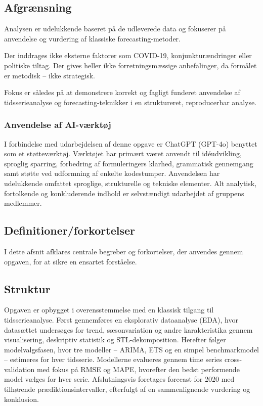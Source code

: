 \documentclass[
]{article}
\begin{document}
\subsection{Afgrænsning}\label{afgruxe6nsning}

Analysen er udelukkende baseret på de udleverede data og fokuserer på
anvendelse og vurdering af klassiske forecasting-metoder.

Der inddrages ikke eksterne faktorer som COVID-19, konjunkturændringer
eller politiske tiltag. Der gives heller ikke forretningsmæssige
anbefalinger, da formålet er metodisk -- ikke strategisk.

Fokus er således på at demonstrere korrekt og fagligt funderet
anvendelse af tidsserieanalyse og forecasting-teknikker i en
struktureret, reproducerbar analyse.

\subsubsection{Anvendelse af
AI-værktøj}\label{anvendelse-af-ai-vuxe6rktuxf8j}

I forbindelse med udarbejdelsen af denne opgave er ChatGPT (GPT-4o)
benyttet som et støtteværktøj. Værktøjet har primært været anvendt til
idéudvikling, sproglig sparring, forbedring af formuleringers klarhed,
grammatisk gennemgang samt støtte ved udformning af enkelte kodestumper.
Anvendelsen har udelukkende omfattet sproglige, strukturelle og tekniske
elementer. Alt analytisk, fortolkende og konkluderende indhold er
selvstændigt udarbejdet af gruppens medlemmer.

\subsection{Definitioner/forkortelser}\label{definitionerforkortelser}

I dette afsnit afklares centrale begreber og forkortelser, der anvendes
gennem opgaven, for at sikre en ensartet forståelse.

\subsection{Struktur}\label{struktur}

Opgaven er opbygget i overensstemmelse med en klassisk tilgang til
tidsserieanalyse. Først gennemføres en eksplorativ dataanalyse (EDA),
hvor datasættet undersøges for trend, sæsonvariation og andre
karakteristika gennem visualisering, deskriptiv statistik og
STL-dekomposition. Herefter følger modelvalgsfasen, hvor tre modeller --
ARIMA, ETS og en simpel benchmarkmodel -- estimeres for hver tidsserie.
Modellerne evalueres gennem time series cross-validation med fokus på
RMSE og MAPE, hvorefter den bedst performende model vælges for hver
serie. Afslutningsvis foretages forecast for 2020 med tilhørende
prædiktionsintervaller, efterfulgt af en sammenlignende vurdering og
konklusion.
\end{document}
